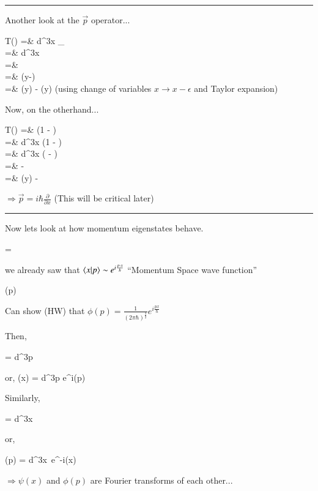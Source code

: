 {\noindent\rule{\textwidth}{1pt}

Another look at the $\vec{p}$ operator...


\bea
{}T(\epsilon)\ket{\psi} =& \int d^3x _{}\\
               =& \int d^3x   \\
               =&   \\
               =& \psi(y-\epsilon)  \\
               =& \psi(y) - \epsilon {} \psi(y)
\eea
(using change of variables $x\rightarrow x - \epsilon$ and Taylor expansion)

Now, on the otherhand...

\bea
{}T(\epsilon)\ket{\psi} =&  \left(1 -  \right) \ket{\psi}\\
               =& \int d^3x  \left(1 -  \right) \ket{\psi}\\
               =& \int d^3x  \left(  -  \ket{\psi} \right)\\
               =&    -   \ket{\psi}\\
               =&   \psi(y) -  \epsilon {}  \ket{\psi}\\
\eea


$\Rightarrow \vec{p} = i \hbar \frac{\partial}{\partial x}$
(This will be critical later)

\noindent\rule{\textwidth}{1pt}

Now lets look at how momentum eigenstates behave.

\be
{} = 
\ee

we already saw that $\braket{x|p} \sim e^{i\frac{p\cdot x}{\hbar}}$
``Momentum Space wave function''

\be
\phi(p) \equiv {} 
\ee

Can show (HW) that $\phi(p) = \frac{1}{(2\pi \hbar)^{\frac{3}{2}}} e^{i\frac{px}{\hbar}}$

Then, 

\be
{} = \int d^3p 
\ee

or,
\be
\psi(x) =  \int d^3p e^{i}\phi(p)
\ee

Similarly,

\be
{} = \int d^3x 
\ee

or,

\be
\phi(p) =  \int d^3x\ e^{-i}\psi(x)
\ee


$\Rightarrow \psi(x)$ and $\phi(p)$ are Fourier transforms of each other...


} 


